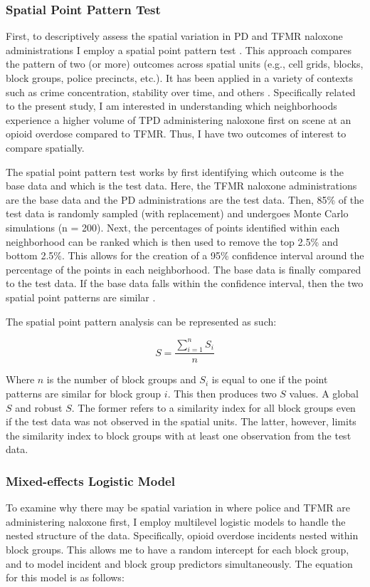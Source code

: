 \subsubsection{Spatial Point Pattern Test}

First, to descriptively assess the spatial variation in PD and TFMR naloxone administrations I employ a spatial point pattern test \parencite{andresen_testing_2009}. This approach compares the pattern of two (or more) outcomes across spatial units (e.g., cell grids, blocks, block groups, police precincts, etc.). It has been applied in a variety of contexts such as crime concentration, stability over time, and others \parencite{andresen_crime_2017, ha_spatial_2020, ratcliffe_detecting_2005}. Specifically related to the present study, I am interested in understanding which neighborhoods experience a higher volume of TPD administering naloxone first on scene at an opioid overdose compared to TFMR. Thus, I have two outcomes of interest to compare spatially. 

The spatial point pattern test works by first identifying which outcome is the base data and which is the test data. Here, the TFMR naloxone administrations are the base data and the PD administrations are the test data. Then, 85\% of the test data is randomly sampled (with replacement) and undergoes Monte Carlo simulations (n = 200). Next, the percentages of points identified within each neighborhood can be ranked which is then used to remove the top 2.5\% and bottom 2.5\%. This allows for the creation of a 95\% confidence interval around the percentage of the points in each neighborhood. The base data is finally compared to the test data. If the base data falls within the confidence interval, then the two spatial point patterns are similar \parencite{andresen_testing_2009}.

The spatial point pattern analysis can be represented as such:

\[
    S = \frac{\sum_{i=1}^n S_i}{n}
\]

\noindent Where \(n\) is the number of block groups and \(S_i\) is equal to one if the point patterns are similar for block group \(i\). This then produces two \(S\) values. A global \(S\) and robust \(S\). The former refers to a similarity index for all block groups even if the test data was not observed in the spatial units. The latter, however, limits the similarity index to block groups with at least one observation from the test data. 

\subsubsection{Mixed-effects Logistic Model}
To examine why there may be spatial variation in where police and TFMR are administering naloxone first, I employ multilevel logistic models to handle the nested structure of the data. Specifically, opioid overdose incidents nested within block groups. This allows me to have a random intercept for each block group, and to model incident and block group predictors simultaneously. The equation for this model is as follows:

